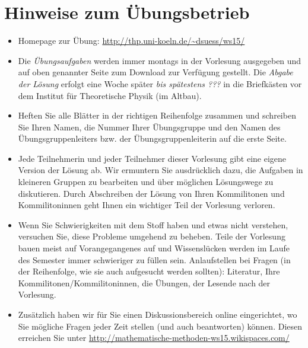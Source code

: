 \documentclass[11pt]{scrartcl}
\begin{document}
\maketitle

\section*{Hinweise zum Übungsbetrieb}
\begin{itemize}
  \item Homepage zur Übung: \url{http://thp.uni-koeln.de/~dsuess/ws15/}
  \item Die \emph{Übungsaufgaben} werden immer montags in der Vorlesung ausgegeben und auf oben genannter Seite zum Download zur Verfügung gestellt. Die \emph{Abgabe der Lösung} erfolgt eine Woche später \emph{bis spätestens ???} in die Briefkästen vor dem Institut für Theoretische Physik (im Altbau).
  \item Heften Sie alle Blätter in der richtigen Reihenfolge zusammen und schreiben Sie Ihren Namen, die Nummer Ihrer Übungsgruppe und den Namen des Übungsgruppenleiters bzw. der Übungsgruppenleiterin auf die erste Seite. 
  \item Jede Teilnehmerin und jeder Teilnehmer dieser Vorlesung gibt eine eigene Version der Lösung ab. Wir ermuntern Sie ausdrücklich dazu, die Aufgaben in kleineren Gruppen zu bearbeiten und über möglichen Lösungswege zu diskutieren. Durch Abschreiben der Lösung von Ihren Kommilitonen und Kommilitoninnen geht Ihnen ein wichtiger Teil der Vorlesung verloren.
  \item Wenn Sie Schwierigkeiten mit dem Stoff haben und etwas nicht verstehen, versuchen Sie, diese Probleme umgehend zu beheben. Teile der Vorlesung bauen meist auf Vorangegangenes auf und Wissenslücken werden im Laufe des Semester immer schwieriger zu füllen sein. Anlaufstellen bei Fragen (in der Reihenfolge, wie sie auch aufgesucht werden sollten): Literatur, Ihre Kommilitonen/Kommilitoninnen, die Übungen, der Lesende nach der Vorlesung.
  \item Zusätzlich haben wir für Sie einen Diskussionsbereich online eingerichtet, wo Sie mögliche Fragen jeder Zeit stellen (und auch beantworten) können. Diesen erreichen Sie unter \url{http://mathematische-methoden-ws15.wikispaces.com/}
\end{itemize}
\end{document}

